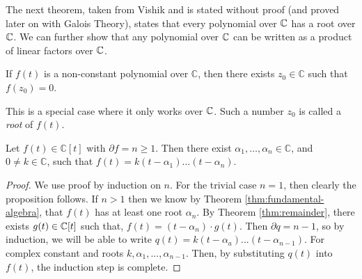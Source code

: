 The next theorem, taken from Vishik \cite{complex-functions-uon} and is stated without proof (and proved later on with Galois Theory), states that every polynomial over $\mathbb C$ has a root over $\mathbb C$. We can further show that any polynomial over $\mathbb C$ can be written as a product of linear factors over $\mathbb C$. 


\begin{theorem} \label{thm:fundamental-algebra}
    If $f(t)$ is a non-constant polynomial over $\mathbb{C}$, then there exists $z_0 \in \mathbb{C}$ such that $f\left(z_0\right)=0$.
\end{theorem}

This is a special case where it only works over $\mathbb C$. Such a number $z_0$ is called a \textit{root} of $f(t)$. 

\begin{theorem} \label{thm:fundamental-algebra-2}
	Let $f(t) \in \mathbb{C}[t]$ with $\partial f=n \geq 1$. Then there exist $\alpha_1, \ldots, \alpha_n \in \mathbb{C}$, and $0 \neq k \in \mathbb{C}$, such that
	$
	f(t)=k\left(t-\alpha_1\right) \ldots\left(t-\alpha_n\right).
	$
\end{theorem}

\begin{proof}
	We use proof by induction on $n$. For the trivial case $n = 1$, then clearly the proposition follows. If $n > 1$ then we know by Theorem \ref{thm:fundamental-algebra}, that $f(t)$ has at least one root $\alpha_n$. By Theorem \ref{thm:remainder}, there exists $g(t) \in \mathbb C[t]$ such that,
		$f(t) = (t-\alpha_n)\cdot g(t)$. 
	Then $\partial q = n - 1$, so by induction, we will be able to write
		$q(t) = k(t-\alpha_a)...(t-\alpha_{n-1})$. 
	For complex constant and roots $k,\alpha_1,...,\alpha_{n-1}$. Then, by substituting $q(t)$ into $f(t)$, the induction step is complete.
\end{proof}